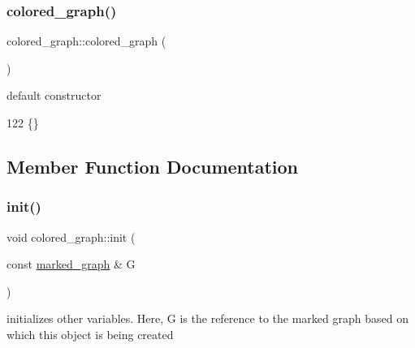 \subsubsection{\texorpdfstring{colored\+\_\+graph()}{colored\_graph()}\hspace{0.1cm}{\footnotesize\ttfamily [2/2]}}
{\footnotesize\ttfamily colored\+\_\+graph\+::colored\+\_\+graph (\begin{DoxyParamCaption}{ }\end{DoxyParamCaption})\hspace{0.3cm}{\ttfamily [inline]}}



default constructor 


\begin{DoxyCode}
122 \{\}
\end{DoxyCode}


\subsection{Member Function Documentation}
\mbox{\label{classcolored__graph_a0e867afa9f5491dfc05bed10680f0709}} 
\subsubsection{\texorpdfstring{init()}{init()}}
{\footnotesize\ttfamily void colored\+\_\+graph\+::init (\begin{DoxyParamCaption}\item[{const \hyperlink{classmarked__graph}{marked\+\_\+graph} \&}]{G }\end{DoxyParamCaption})}



initializes other variables. Here, G is the reference to the marked graph based on which this object is being created 


